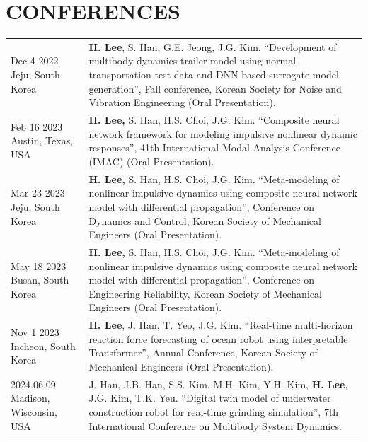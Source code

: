 \documentclass[a4paper,10pt]{extarticle}
\begin{document}
\section*{CONFERENCES}
\noindent
{}
\vspace*{-.5cm}
\begin{longtable}{LR}
    {Dec 4 2022 \linebreak Jeju, South Korea}    & \textbf{H. Lee}, S. Han, G.E. Jeong, J.G. Kim. “Development of multibody dynamics trailer model using normal transportation test data and DNN based surrogate model generation”, Fall conference, Korean Society for Noise and Vibration Engineering (Oral Presentation). \\
    {Feb 16 2023 \linebreak  Austin, Texas, USA} & \textbf{H. Lee,} S. Han, H.S. Choi, J.G. Kim. “Composite neural network framework for modeling impulsive nonlinear dynamic responses”, 41th International Modal Analysis Conference (IMAC) (Oral Presentation).                                                                  \\
    {Mar 23 2023 \linebreak Jeju, South Korea}   & \textbf{H. Lee,} S. Han, H.S. Choi, J.G. Kim. “Meta-modeling of nonlinear impulsive dynamics using composite neural network model with differential propagation”, Conference on Dynamics and Control, Korean Society of Mechanical Engineers (Oral Presentation).         \\
    {May 18 2023 \linebreak Busan, South Korea}  & \textbf{H. Lee,} S. Han, H.S. Choi, J.G. Kim. “Meta-modeling of nonlinear impulsive dynamics using composite neural network model with differential propagation”, Conference on Engineering Reliability, Korean Society of Mechanical Engineers (Oral Presentation).      \\
    {Nov 1 2023 \linebreak Incheon, South Korea} & \textbf{H. Lee}, J. Han, T. Yeo, J.G. Kim. “Real-time multi-horizon reaction force forecasting of ocean robot using interpretable Transformer”, Annual Conference, Korean Society of Mechanical Engineers (Oral Presentation).                                            \\
    {2024.06.09 \linebreak Madison, Wisconsin, USA}         & J. Han, J.B. Han, S.S. Kim, M.H. Kim, Y.H. Kim, \textbf{H. Lee}, J.G. Kim, T.K. Yeu. “Digital twin model of underwater construction robot for real-time grinding simulation”, 7th International Conference on Multibody System Dynamics.                             \\
\end{longtable}
\end{document}
